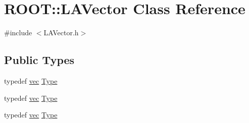 \hypertarget{classROOT_1_1Minuit2_1_1LAVector}{}\section{R\+O\+OT\+:\+:L\+A\+Vector Class Reference}
\label{classROOT_1_1Minuit2_1_1LAVector}


{\ttfamily \#include $<$L\+A\+Vector.\+h$>$}

\subsection*{Public Types}
\begin{DoxyCompactItemize}
\item 
typedef \mbox{\hyperlink{classROOT_1_1Minuit2_1_1vec}{vec}} \mbox{\hyperlink{classROOT_1_1Minuit2_1_1LAVector_a3ca6d24ac34f5e322623ac131e090f20}{Type}}
\item 
typedef \mbox{\hyperlink{classROOT_1_1Minuit2_1_1vec}{vec}} \mbox{\hyperlink{classROOT_1_1Minuit2_1_1LAVector_a3ca6d24ac34f5e322623ac131e090f20}{Type}}
\item 
typedef \mbox{\hyperlink{classROOT_1_1Minuit2_1_1vec}{vec}} \mbox{\hyperlink{classROOT_1_1Minuit2_1_1LAVector_a3ca6d24ac34f5e322623ac131e090f20}{Type}}
\end{DoxyCompactItemize}
